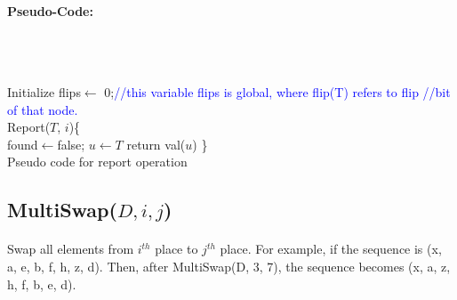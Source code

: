 \documentclass[pdftex,a4paper,12pt]{report}
\begin{document}
\paragraph{Pseudo-Code:} \mbox{} \\\\
\begin{algorithm}
Initialize flips$\gets$ 0;\makebox[40pt]{}\textcolor{blue}{//this variable flips is global, where flip(T) refers to
 flip \makebox[150pt]{}//bit of that node.}\\
Report($T$, $i$)\{\\
		found$\gets$false; $u\gets T$\;
		return val($u$)\;
\}\\
\caption{Pseudo code for report operation}
\end{algorithm}


\newpage
\subsection{MultiSwap($D, i, j$)}
\paragraph{} Swap all elements from $ i^{th} $ place to $ j^{th} $ place. For example, if the sequence is
(x, a, e, b, f, h, z, d). Then, after MultiSwap(D, 3, 7), the sequence becomes (x, a, z, h, f, b, e, d).
\end{document}
